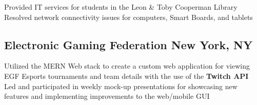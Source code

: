 \documentclass[a4paper]{Resume}
\begin{document}
\begin{onehalfspace}
\pt Provided IT services for students in the Leon & Toby Cooperman Library \\

\pt Resolved network connectivity issues for computers, Smart Boards, and tablets \\
\sectionsep


\subsection{Electronic Gaming Federation \hfill \normalfont New York, NY}

\pt Utilized the MERN Web stack to create a custom web application for viewing EGF Esports tournaments and team details with the use of the \textbf{Twitch API} \\

\pt Led and participated in weekly mock-up presentations for showcasing new features and implementing improvements to the web/mobile GUI  \\

\sectionsep

\end{onehalfspace}

\end{document}
